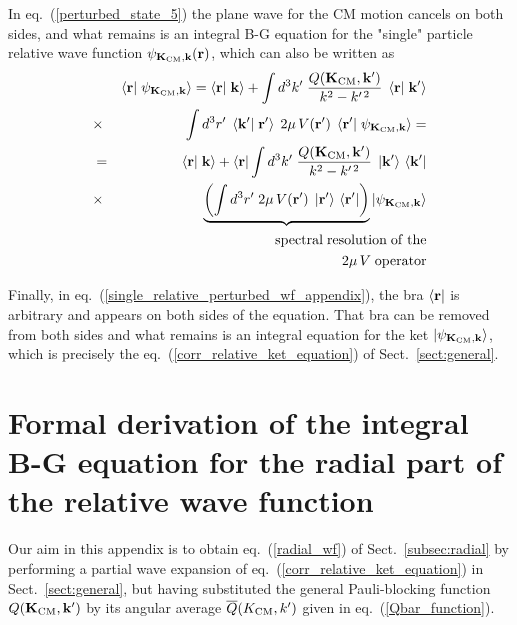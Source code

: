 \documentclass[aps,twocolumn,showpacs,preprintnumbers,amsmath,amssymb,nofootinbib,superscriptaddress,showkeys,noeprint]{revtex4-1}
\newcommand{\nk}{{\bf k}}
\newcommand{\nK}{{\bf K}}
\newcommand{\nr}{{\bf r}}
\begin{document}
In eq.~(\ref{perturbed_state_5}) the plane wave for the CM motion
cancels on both sides, and what remains is an integral B-G equation
for the "single" particle relative wave function $\psi_{\nK_{\rm
    CM},\nk}(\nr)$, which can also be written as
\begin{eqnarray}
&&\left\langle \nr \right| \left. \psi_{\nK_{\rm CM},\nk} \right\rangle =
\left\langle \nr \right| \left. \nk \right\rangle + 
\int d^3k^\prime \; \frac{Q(\nK_{\rm CM},\nk^\prime)}{k^2-k^{\prime\,2}}\;
\left\langle \nr \right| \left. \nk^\prime \right\rangle \nonumber\\
&\times& \int d^3r^\prime \; 
\left\langle \nk^\prime \right| \left. \nr^\prime \right\rangle\;
2\mu\, V(\nr^\prime) \;
\left\langle \nr^\prime \right| \left. \psi_{\nK_{\rm CM},\nk} \right\rangle=
\nonumber\\
&=& \left\langle \nr \right| \left. \nk \right\rangle +
\left\langle \nr \right| \int d^3k^\prime \; 
\frac{Q(\nK_{\rm CM},\nk^\prime)}{k^2-k^{\prime\,2}}\; 
\left| \nk^\prime \right\rangle\, \left\langle \nk^\prime \right|
\nonumber\\
&\times&\underbrace{\left( 
\int d^3r^\prime \; 2\mu\, V(\nr^\prime) \; 
\left| \nr^\prime \right\rangle \, \left\langle \nr^\prime \right|
\right)}  \left| \psi_{\nK_{\rm CM},\nk} \right\rangle 
\label{single_relative_perturbed_wf_appendix} \\
&& {\rm spectral}\; {\rm resolution} \;  {\rm of}\; {\rm the}\nonumber\\
&&\qquad 2\mu\,V \; {\rm operator} \nonumber
\end{eqnarray}

Finally, in eq.~(\ref{single_relative_perturbed_wf_appendix}), the bra
$\left\langle \nr \right|$ is arbitrary and appears on both sides of
the equation. That bra can be removed from both sides and what remains
is an integral equation for the ket $\left| \psi_{\nK_{\rm CM},\nk}
\right\rangle$, which is precisely the
eq.~(\ref{corr_relative_ket_equation}) of Sect.~\ref{sect:general}.

\section{Formal derivation of the integral B-G equation
for the radial part of the relative wave function}\label{derivation_radial}

Our aim in this appendix is to obtain eq.~(\ref{radial_wf}) of
Sect.~\ref{subsec:radial} by performing a partial wave expansion of
eq.~(\ref{corr_relative_ket_equation}) in Sect.~\ref{sect:general},
but having substituted the general Pauli-blocking function $Q(\nK_{\rm
  CM},\nk^\prime)$ by its angular average $\overline{Q}(K_{\rm
  CM},k^\prime)$ given in eq.~(\ref{Qbar_function}).
\end{document}
